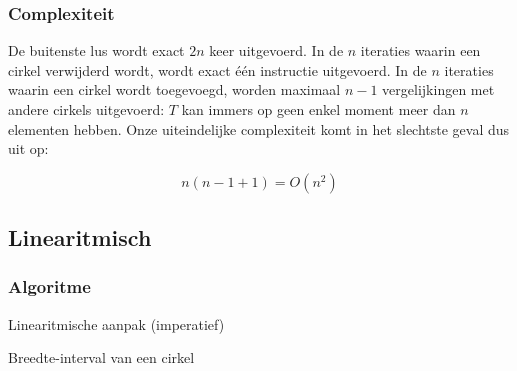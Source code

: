 \subsubsection{Complexiteit}
De buitenste lus wordt exact $2n$ keer uitgevoerd. In de $n$ iteraties
waarin een cirkel verwijderd wordt, wordt exact \'e\'en instructie
uitgevoerd. In de $n$ iteraties waarin een cirkel wordt toegevoegd,
worden maximaal $n - 1$ vergelijkingen met andere cirkels uitgevoerd:
$T$ kan immers op geen enkel moment meer dan $n$ elementen
hebben. Onze uiteindelijke complexiteit komt in het slechtste geval dus uit op:

\[ n (n - 1 + 1) = O(n^2) \]


\subsection{Linearitmisch}
\label{sec:linearitmisch}

\subsubsection{Algoritme}

\begin{algorithm}[H]
  \SetAlgoLined
  \label{algo:linearithmic}
  \caption{Linearitmische aanpak (imperatief)}
\end{algorithm}

\begin{algorithm}[H]
  \SetAlgoLined
  \caption{Breedte-interval van een cirkel}
  \label{algo:interval}
\end{algorithm}

